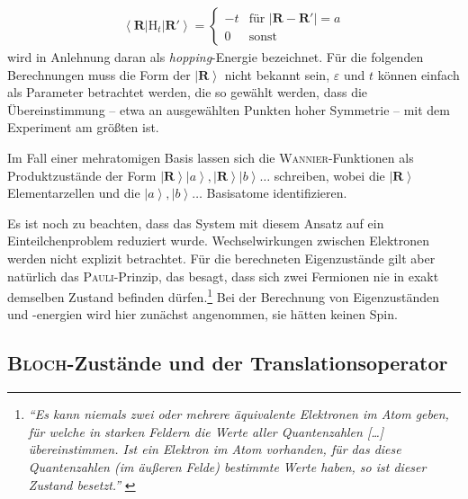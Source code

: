 \documentclass[a4paper, 10pt, twoside, openany]{book} %
\newcommand \bra[1]{\left \langle #1 \right |}
\newcommand \ket[1]{\left | #1 \right \rangle}
\newcommand \abs[1]{\left | #1 \right |}
\def \epsilon {\varepsilon}
\def \vec {\boldsymbol}
\newcommand \op[1]{\mathrm{#1}}
\begin{document}
	\begin{align*}
		\bra{\vec R} \op H_t \ket{\vec R'} =
		\begin{cases}
			-t & \text{für } \abs{\vec R - \vec R'} = a \\
			0 & \text{sonst}
		\end{cases}
	\end{align*}
	wird in Anlehnung daran als \emph{hopping}-Energie bezeichnet. Für die folgenden Berechnungen muss die Form der $\ket{\vec R}$ nicht bekannt sein, $\epsilon$ und $t$ können einfach als Parameter betrachtet werden, die so gewählt werden, dass die Übereinstimmung -- etwa an ausgewählten Punkten hoher Symmetrie -- mit dem Experiment am größten ist.
	
	Im Fall einer mehratomigen Basis lassen sich die \textsc{Wannier}-Funktionen als Produktzustände der Form $\ket{\vec R} \ket{a}, \ket{\vec R} \ket{b}\dots$ schreiben, wobei die $\ket{\vec R}$ Elementarzellen und die $\ket a, \ket b\dots$ Basisatome identifizieren.
	
	Es ist noch zu beachten, dass das System mit diesem Ansatz auf ein Einteilchenproblem reduziert wurde. Wechselwirkungen zwischen Elektronen werden nicht explizit betrachtet. Für die berechneten Eigenzustände gilt aber natürlich das \textsc{Pauli}-Prinzip, das besagt, dass sich zwei Fermionen nie in exakt demselben Zustand befinden dürfen.\footnote{\emph{"`Es kann niemals zwei oder mehrere äquivalente Elektronen im Atom geben, für welche in starken Feldern die Werte aller Quantenzahlen \emph{[\dots]} übereinstimmen. Ist ein Elektron im Atom vorhanden, für das diese Quantenzahlen (im äußeren Felde) bestimmte Werte haben, so ist dieser Zustand \glq besetzt\grq."'} \cite[S.~776]{Pauli}} Bei der Berechnung von Eigenzuständen und -energien wird hier zunächst angenommen, sie hätten keinen Spin. 
	
	\subsection{\textsc{Bloch}-Zustände und der Translationsoperator}
	
\end{document}
